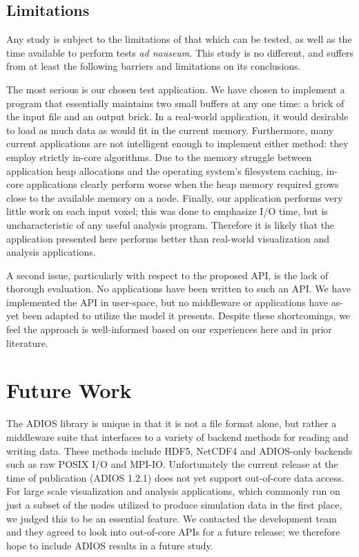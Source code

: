 \subsection{Limitations}\label{sec:issues}

Any study is subject to the limitations of that which can be tested, as
well as the time available to perform tests \textit{ad nauseum}.  This
study is no different, and suffers from at least the following barriers
and limitations on its conclusions.

The most serious is our chosen test application.  We have chosen to
implement a program that essentially maintains two small buffers
at any one time: a brick of the input file and an output brick.
In a real-world application, it would desirable to load as much
data as would fit in the current memory.  Furthermore, many current
applications are not intelligent enough to implement either method:
they employ strictly in-core algorithms.  Due to the memory struggle
between application heap allocations and the operating system's
filesystem caching, in-core applications clearly perform worse when the
heap memory required grows close to the available memory on a node.
Finally, our application performs very little work on each input voxel;
this was done to emphasize I/O time, but is uncharacteristic of any
useful analysis program.
Therefore it is likely that the application presented here performs
better than real-world visualization and analysis applications.

A second issue, particularly with respect to the proposed API, is
the lack of thorough evaluation.  No applications have been written
to such an API.  We have implemented the API in user-space, but no
middleware or applications have as-yet been adapted to utilize the
model it presents.  Despite these shortcomings, we feel the approach is
well-informed based on our experiences here and in prior literature.

\section{Future Work}

The ADIOS library is unique in that it is not a file format alone,
but rather a middleware suite that interfaces to a variety of backend
methods for reading and writing data.  These methods include HDF5,
NetCDF4 and ADIOS-only backends such as raw POSIX I/O and MPI-IO.
Unfortunately the current release at the time of publication (ADIOS
1.2.1) does not yet support out-of-core data access.  For large scale
visualization and analysis applications, which commonly run on just a
subset of the nodes utilized to produce simulation data in the first
place, we judged this to be an essential feature.  We contacted the
development team and they agreed to look into out-of-core APIs for a
future release; we therefore hope to include ADIOS results in a future
study.

